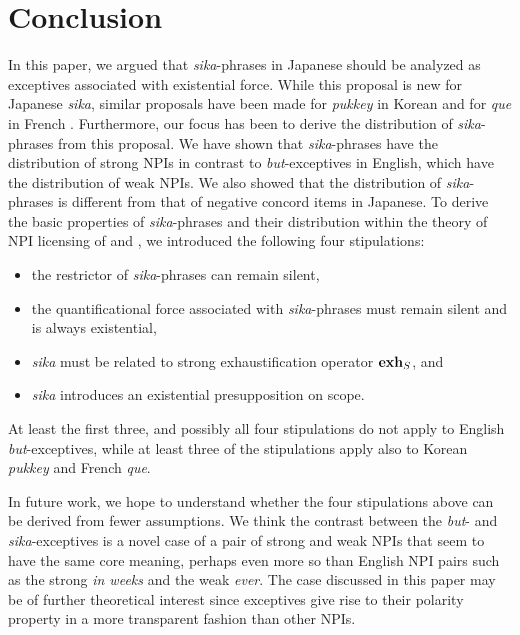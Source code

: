 \documentclass[output=paper]{langscibook}
\def\exh{\ifmmode\mathop{\textbf{exh}}\else\textbf{exh}\xspace\fi}
\begin{document}
\section{Conclusion}

In this paper, we argued that \emph{sika}-phrases in Japanese should be analyzed as exceptives associated with existential force.  While this proposal is new for Japanese \emph{sika}, similar proposals have been made for \emph{pukkey} in Korean \citep{sells01a} and for \emph{que} in French \citep{fintel07a}. Furthermore, our focus has been to derive the distribution of \emph{sika}-phrases from this proposal.  We have shown that \emph{sika}-phrases have the distribution of strong NPIs in contrast to \emph{but}-exceptives in English, which have the distribution of weak NPIs.  We also showed that the distribution of \emph{sika}-phrases is different from that of negative concord items in Japanese.   To derive the basic properties of \emph{sika}-phrases and their distribution within the theory of NPI licensing of \citet{gajewski11a} and \citet{chierchia13a}, we introduced the following four stipulations:

\begin{itemize}
    \item the restrictor of \emph{sika}-phrases can remain silent, 
    \item the quantificational force associated with \emph{sika}-phrases must remain silent and is always existential,
    \item \emph{sika} must be related to strong exhaustification operator $\exh_S$, and
    \item \emph{sika} introduces an existential presupposition on scope.
\end{itemize}

At least the first three, and possibly all four stipulations do not apply to English \emph{but}-exceptives, while at least three of the stipulations apply also to Korean \emph{pukkey} and French \emph{que}.  

In future work, we hope to understand whether the four stipulations above can be derived from fewer assumptions.
We think the contrast between the \emph{but}- and \emph{sika}-exceptives is a novel case of a pair of strong and weak NPIs that seem to have the same core meaning, perhaps even more so than English NPI pairs such as the strong \emph{in weeks} and the weak \emph{ever}. The case discussed in this paper may be of further theoretical interest since exceptives  give rise to their polarity property in a more transparent fashion than other NPIs.
\end{document}
